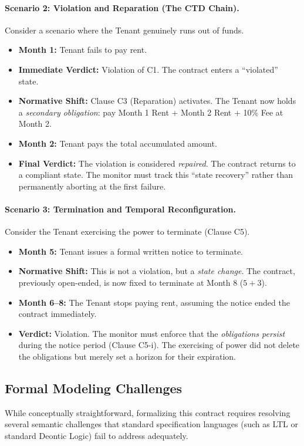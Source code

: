 \documentclass{article}
\begin{document}
    \paragraph{Scenario 2: Violation and Reparation (The CTD Chain).}
    Consider a scenario where the Tenant genuinely runs out of funds.
    \begin{itemize}
        \item \textbf{Month 1:} Tenant fails to pay rent.
        \item \textbf{Immediate Verdict:} Violation of C1. The contract enters a ``violated'' state.
        \item \textbf{Normative Shift:} Clause C3 (Reparation) activates. The Tenant now holds a \emph{secondary obligation}: pay Month 1 Rent + Month 2 Rent + 10\% Fee at Month 2.
        \item \textbf{Month 2:} Tenant pays the total accumulated amount.
        \item \textbf{Final Verdict:} The violation is considered \emph{repaired}. The contract returns to a compliant state. The monitor must track this ``state recovery'' rather than permanently aborting at the first failure.
    \end{itemize}
    
    \paragraph{Scenario 3: Termination and Temporal Reconfiguration.}
    Consider the Tenant exercising the power to terminate (Clause C5).
    \begin{itemize}
        \item \textbf{Month 5:} Tenant issues a formal written notice to terminate.
        \item \textbf{Normative Shift:} This is not a violation, but a \emph{state change}. The contract, previously open-ended, is now fixed to terminate at Month 8 ($5+3$).
        \item \textbf{Month 6--8:} The Tenant stops paying rent, assuming the notice ended the contract immediately.
        \item \textbf{Verdict:} Violation. The monitor must enforce that the \emph{obligations persist} during the notice period (Clause C5-i). The exercising of power did not delete the obligations but merely set a horizon for their expiration.
    \end{itemize}
    
    \subsection*{Formal Modeling Challenges}
    \label{subsec:formal-challenges}
    While conceptually straightforward, formalizing this contract requires resolving several semantic challenges that standard specification languages (such as LTL or standard Deontic Logic) fail to address adequately.
    
\end{document}
